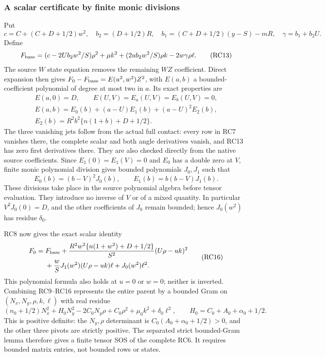 \subsubsection*{A scalar certificate by finite monic divisions}

Put
\[
 c=C+(C+D+1/2)w^2,\quad b_2=(D+1/2)R,
 \quad b_1=(C+D+1/2)(y-S)-mR,\quad \gamma=b_1+b_2U.
\]
Define
\[
 F_{\rm base}=(c-2Ub_2w^2/S)\rho^2+\mu k^2
       +(2ub_2w^2/S)\rho k-2w\gamma\rho\ell.
 \tag{RC13}
\]
The source $W$ state equation removes the remaining $WZ$
coefficient. Direct expansion then gives
$F_0-F_{\rm base}=E(u^2,w^2)Z^2$, with $E(a,b)$ a
bounded-coefficient polynomial of degree at most two in $a$.
Its exact properties are
\[
\begin{gathered}
 E(a,0)=D,\qquad E(U,V)=E_a(U,V)=E_b(U,V)=0,\\
 E(a,b)=E_0(b)+(a-U)E_1(b)+(a-U)^2E_2(b),\\
 E_2(b)=R^2b^2\{n(1+b)+D+1/2\}.
\end{gathered}\tag{RC14}
\]
The three vanishing jets follow from the actual full contact:
every row in RC7 vanishes there, the complete scalar and both
angle derivatives vanish, and RC13 has zero first derivatives
there. They are also checked directly from the native source
coefficients. Since $E_1(0)=E_1(V)=0$ and $E_0$ has a double
zero at $V$, finite monic polynomial division gives bounded
polynomials $J_0,J_1$ such that
\[
 E_0(b)=(b-V)^2J_0(b),\qquad
 E_1(b)=b(b-V)J_1(b).
 \tag{RC15}
\]
These divisions take place in the source polynomial algebra before
tensor evaluation. They introduce no inverse of $V$ or of a mixed
quantity. In particular $V^2J_0(0)=D$, and the other coefficients
of $J_0$ remain bounded; hence $J_0(w^2)$ has residue $\delta_0$.

RC8 now gives the exact scalar identity
\[
\begin{split}
 F_0={}&F_{\rm base}
 +\frac{R^2w^2\{n(1+w^2)+D+1/2\}}{S^2}(U\rho-uk)^2\\
 &+\frac wS J_1(w^2)(U\rho-uk)\ell+J_0(w^2)\ell^2.
\end{split}\tag{RC16}
\]
This polynomial formula also holds at $u=0$ or $w=0$; neither
is inverted. Combining RC9--RC16 represents the entire parent
by a bounded Gram on $(N_x,N_y,\rho,k,\ell)$ with real residue
\[
 (n_0+1/2)N_x^2+H_0N_y^2-2C_0N_y\rho+C_0\rho^2
                              +\mu_0k^2+\delta_0\ell^2,
 \qquad H_0=C_0+A_0+\alpha_0+1/2.
 \tag{RC17}
\]
This is positive definite: the $N_y,\rho$ determinant is
$C_0(A_0+\alpha_0+1/2)>0$, and the other three pivots are
strictly positive. The separated strict bounded-Gram lemma
therefore gives a finite tensor SOS of the complete RC6. It
requires bounded matrix entries, not bounded rows or states.

